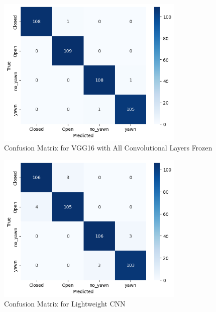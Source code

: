 \begin{figure}[htbp]
\centering
\includegraphics[width=0.8\textwidth]{vgg_16_freeze.png}
\caption{Confusion Matrix for VGG16 with All Convolutional Layers Frozen}
\end{figure}

\begin{figure}[htbp]
\centering
\includegraphics[width=0.8\textwidth]{conf_cnn.png}
\caption{Confusion Matrix for Lightweight CNN}
\end{figure}
